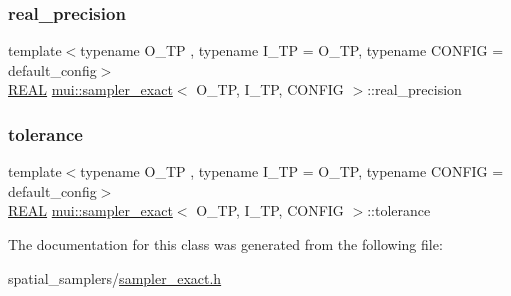 \mbox{\label{classmui_1_1sampler__exact_a8bc66e3304c7de677e88b24b9cb3cfbb}} 
\subsubsection{\texorpdfstring{real\+\_\+precision}{real\_precision}}
{\footnotesize\ttfamily template$<$typename O\+\_\+\+TP , typename I\+\_\+\+TP  = O\+\_\+\+TP, typename C\+O\+N\+F\+IG  = default\+\_\+config$>$ \\
\hyperlink{classmui_1_1sampler__exact_a204186f8735dcdfe021c7e3a36a077bf}{R\+E\+AL} \hyperlink{classmui_1_1sampler__exact}{mui\+::sampler\+\_\+exact}$<$ O\+\_\+\+TP, I\+\_\+\+TP, C\+O\+N\+F\+IG $>$\+::real\+\_\+precision\hspace{0.3cm}{\ttfamily [protected]}}

\mbox{\label{classmui_1_1sampler__exact_a76c2cb56624e36ddb2a22c28cc8c9dbb}} 
\subsubsection{\texorpdfstring{tolerance}{tolerance}}
{\footnotesize\ttfamily template$<$typename O\+\_\+\+TP , typename I\+\_\+\+TP  = O\+\_\+\+TP, typename C\+O\+N\+F\+IG  = default\+\_\+config$>$ \\
\hyperlink{classmui_1_1sampler__exact_a204186f8735dcdfe021c7e3a36a077bf}{R\+E\+AL} \hyperlink{classmui_1_1sampler__exact}{mui\+::sampler\+\_\+exact}$<$ O\+\_\+\+TP, I\+\_\+\+TP, C\+O\+N\+F\+IG $>$\+::tolerance\hspace{0.3cm}{\ttfamily [protected]}}



The documentation for this class was generated from the following file\+:\begin{DoxyCompactItemize}
\item 
spatial\+\_\+samplers/\hyperlink{sampler__exact_8h}{sampler\+\_\+exact.\+h}\end{DoxyCompactItemize}
